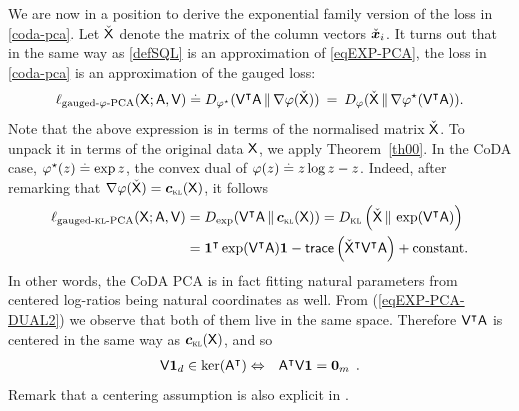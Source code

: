 \documentclass{article}
\begin{document}
We are now in a position to derive the exponential family version of the loss in \eqref{coda-pca}.
Let %
$\check{\mathsf{X}}$ denote the matrix of the column vectors $\check{\bm{x}}_i$.
It turns out that in the same way as \eqref{defSQL} is an
approximation of \eqref{eqEXP-PCA}, the loss in \eqref{coda-pca}
is an approximation of the gauged loss:
\begin{equation}
\ell_{\mathrm{gauged\text{-}\varphi\text{-}PCA}}(\mathsf{X}; \mathsf{A}, \mathsf{V}) \stackrel{\mathrm{.}}{=}
D_{\varphi^\star}(\mathsf{V}^\intercal \mathsf{A}\,\Vert\,\nabla\varphi(\check{\mathsf{X}}))\label{eqEXP-PCA-DUAL-GAUGED}
\:=\:
D_{\varphi}(\check{\mathsf{X}}\,\Vert\,\nabla\varphi^\star(\mathsf{V}^\intercal\mathsf{A})).
\end{equation}
Note that the above expression is in terms of the normalised matrix $\check{\mathsf{X}}$.
To unpack it in terms of the original data $\mathsf{X}$, we apply Theorem~\ref{th00}.
In the CoDA case, $\varphi^\star(z) \stackrel{\mathrm{.}}{=} \exp z$, the convex dual of
$\varphi(z) \stackrel{\mathrm{.}}{=} z \log z - z$. Indeed, after remarking that
$\nabla\varphi(\check{\X}) = \clrlog({\X})$, it follows
\begin{align}
\ell_{\mathrm{gauged\text{-}\kl\text{-}PCA}}(\X; \A, \V)
&=
D_{\exp}(\V^\top \A\,\Vert\,\clrlog({\X}))\label{eqEXP-PCA-DUAL2}
=
D_{\kl}\left(\check{\X}\,\Vert\,\exp(\V^\top \A)\right)\nonumber\\
&=
\bm{1}^\top\exp(\V^\top\A)\bm{1} - \mathsf{trace}\left(\check{\X}^\top \V^\top \A\right)
+ \mathrm{constant}.
\end{align}
In other words, the CoDA PCA is in fact fitting natural parameters
from centered log-ratios being natural coordinates as well.
From (\ref{eqEXP-PCA-DUAL2}) we observe that both of them live in the same space.
Therefore $\mathsf{V}^\intercal\mathsf{A}$ is centered in the same way as $\clrlog({\X})$, and so
\begin{eqnarray}
\mathsf{V} \bm{1}_d \in \mathrm{ker}(\mathsf{A}^\intercal) & \Leftrightarrow & \mathsf{A}^\intercal \mathsf{V} \bm{1} =  \bm{0}_m\:\:.\label{condAV1}
\end{eqnarray}
Remark that a centering assumption is also explicit in \cite[Chapter 8, Eq. 8.1]{aTSB}.
\end{document}
